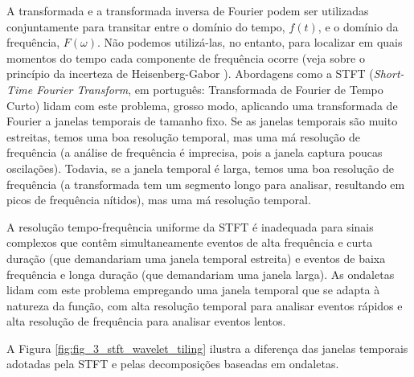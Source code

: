 A transformada e a transformada inversa de Fourier podem ser utilizadas conjuntamente para transitar entre o domínio do tempo, \(f(t)\), e o domínio da frequência, \(F(\omega)\). Não podemos utilizá-las, no entanto, para localizar em quais momentos do tempo cada componente de frequência ocorre (veja sobre o princípio da incerteza de Heisenberg-Gabor \cite{heisenbergBerAnschaulichenInhalt1927}). Abordagens como a STFT (\emph{Short-Time Fourier Transform}, em português: Transformada de Fourier de Tempo Curto) lidam com este problema, grosso modo, aplicando uma transformada de Fourier a janelas temporais de tamanho fixo. Se as janelas temporais são muito estreitas, temos uma boa resolução temporal, mas uma má resolução de frequência (a análise de frequência é imprecisa, pois a janela captura poucas oscilações). Todavia, se a janela temporal é larga, temos uma boa resolução de frequência (a transformada tem um segmento longo para analisar, resultando em picos de frequência nítidos), mas uma má resolução temporal.

A resolução tempo-frequência uniforme da STFT é inadequada para sinais complexos que contêm simultaneamente eventos de alta frequência e curta duração (que demandariam uma janela temporal estreita) e eventos de baixa frequência e longa duração (que demandariam uma janela larga). As ondaletas lidam com este problema empregando uma janela temporal que se adapta à natureza da função, com alta resolução temporal para analisar eventos rápidos e alta resolução de frequência para analisar eventos lentos. 

A Figura \ref{fig:fig_3_stft_wavelet_tiling} ilustra a diferença das janelas temporais adotadas pela STFT e pelas decomposições baseadas em ondaletas.

